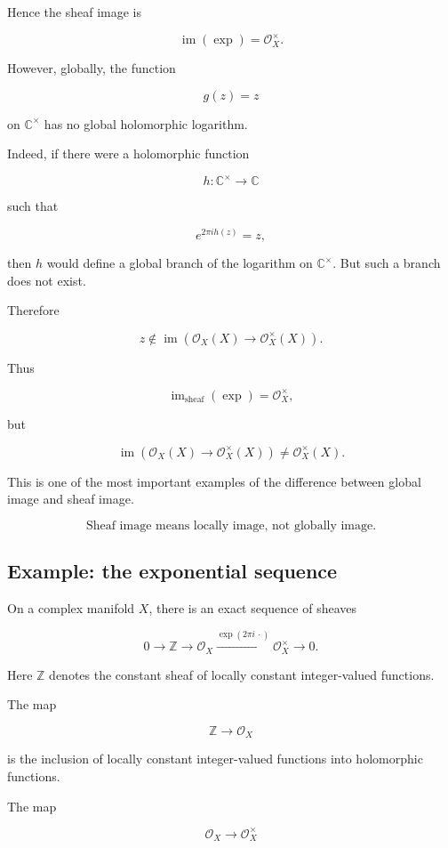 \documentclass[12pt,a4paper]{article}
\DeclareMathOperator{\im}{im}
\theoremstyle{notespace}
\newcommand{\Ocal}{\mathcal O}
\begin{document}
	Hence the sheaf image is
	
	\[
	\im(\exp)=\Ocal_X^\times.
	\]
	
	However, globally, the function
	
	\[
	g(z)=z
	\]
	
	on $\mathbb C^\times$ has no global holomorphic logarithm.
	
	Indeed, if there were a holomorphic function
	
	\[
	h:\mathbb C^\times\to\mathbb C
	\]
	
	such that
	
	\[
	e^{2\pi i h(z)}=z,
	\]
	
	then $h$ would define a global branch of the logarithm on $\mathbb C^\times$.
	But such a branch does not exist.
	
	Therefore
	
	\[
	z\notin
	\im\left(
	\Ocal_X(X)\to \Ocal_X^\times(X)
	\right).
	\]
	
	Thus
	
	\[
	\boxed{
		\im_{\text{sheaf}}(\exp)=\Ocal_X^\times,
	}
	\]
	
	but
	
	\[
	\boxed{
		\im\left(
		\Ocal_X(X)\to \Ocal_X^\times(X)
		\right)
		\neq
		\Ocal_X^\times(X).
	}
	\]
	
	This is one of the most important examples of the difference between global
	image and sheaf image.
	
	\[
	\boxed{
		\text{Sheaf image means locally image, not globally image.}
	}
	\]
	
	\subsection{Example: the exponential sequence}
	
	On a complex manifold $X$, there is an exact sequence of sheaves
	
	\[
	0
	\longrightarrow
	\mathbb Z
	\longrightarrow
	\Ocal_X
	\xrightarrow{\exp(2\pi i\,\cdot)}
	\Ocal_X^\times
	\longrightarrow
	0.
	\]
	
	Here $\mathbb Z$ denotes the constant sheaf of locally constant integer-valued
	functions.
	
	The map
	
	\[
	\mathbb Z\to \Ocal_X
	\]
	
	is the inclusion of locally constant integer-valued functions into holomorphic
	functions.
	
	The map
	
	\[
	\Ocal_X\to \Ocal_X^\times
	\]
	
\end{document}
